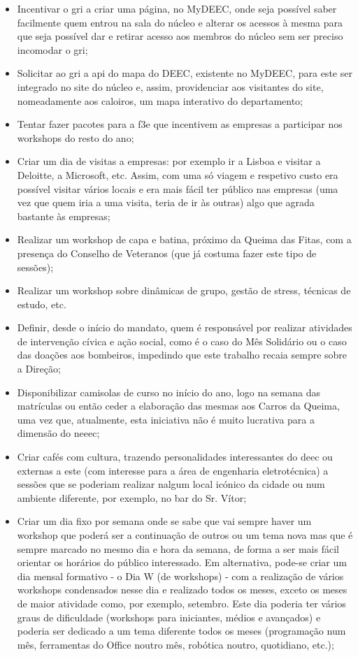 \begin{itemize}
\item Incentivar o \acrshort{gri} a criar uma página, no MyDEEC, onde seja possível saber facilmente quem entrou na sala do núcleo e alterar os acessos à mesma para que seja possível dar e retirar acesso aos membros do núcleo sem ser preciso incomodar o \acrshort{gri};
\item Solicitar ao \acrshort{gri} a \acrshort{api} do mapa do DEEC, existente no MyDEEC, para este ser integrado no site do núcleo e, assim, providenciar aos visitantes do site, nomeadamente aos caloiros, um mapa interativo do departamento;
\item Tentar fazer pacotes para a \acrshort{f3e} que incentivem as empresas a participar nos workshops do resto do ano;
\item Criar um dia de visitas a empresas: por exemplo ir a Lisboa e visitar a Deloitte, a Microsoft, etc. Assim, com uma só viagem e respetivo custo era possível visitar vários locais e era mais fácil ter público nas empresas (uma vez que quem iria a uma visita, teria de ir às outras) algo que agrada bastante às empresas;
\item Realizar um workshop de capa e batina, próximo da Queima das Fitas, com a presença do Conselho de Veteranos (que já costuma fazer este tipo de sessões);
\item Realizar um workshop sobre dinâmicas de grupo, gestão de stress, técnicas de estudo, etc.
\item Definir, desde o início do mandato, quem é responsável por realizar atividades de intervenção cívica e ação social, como é o caso do Mês Solidário ou o caso das doações aos bombeiros, impedindo que este trabalho recaia sempre sobre a Direção;
\item Disponibilizar camisolas de curso no início do ano, logo na semana das matrículas ou então ceder a elaboração das mesmas aos Carros da Queima, uma vez que, atualmente, esta iniciativa não é muito lucrativa para a dimensão do \acrshort{neeec};
\item Criar cafés com cultura, trazendo personalidades interessantes do \acrshort{deec} ou externas a este (com interesse para a área de engenharia eletrotécnica) a sessões que se poderiam realizar nalgum local icónico da cidade ou num ambiente diferente, por exemplo, no bar do Sr. Vítor;
\item Criar um dia fixo por semana onde se sabe que vai sempre haver um workshop que poderá ser a continuação de outros ou um tema nova mas que é sempre marcado no mesmo dia e hora da semana, de forma a ser mais fácil orientar os horários do público interessado. Em alternativa, pode-se criar um dia mensal formativo - o Dia W (de workshops) - com a realização de vários workshops condensados nesse dia e realizado todos os meses, exceto os meses de maior atividade como, por exemplo, setembro. Este dia poderia ter vários graus de dificuldade (workshops para iniciantes, médios e avançados) e poderia ser dedicado a um tema diferente todos os meses (programação num mês, ferramentas do Office noutro mês, robótica noutro, quotidiano, etc.);

\end{itemize}
